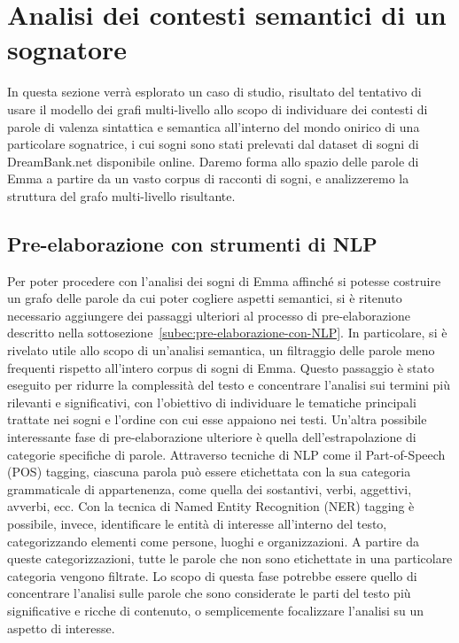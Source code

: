 \section{Analisi dei contesti semantici di un sognatore}\label{sec:analisi-dei-contesti-semantici-di-un-sognatore}

In questa sezione verrà esplorato un caso di studio, risultato del tentativo di usare il modello dei grafi multi-livello
allo scopo di individuare dei contesti di parole di valenza sintattica e semantica all'interno del mondo onirico
di una particolare sognatrice, i cui sogni sono stati prelevati dal dataset di sogni di DreamBank.net disponibile
online.
Daremo forma allo spazio delle parole di Emma a partire da un vasto corpus di racconti di sogni, e analizzeremo la
struttura del grafo multi-livello risultante.

\subsection{Pre-elaborazione con strumenti di NLP}

Per poter procedere con l'analisi dei sogni di Emma affinché si potesse costruire un grafo delle parole
da cui poter cogliere aspetti semantici, si è ritenuto necessario aggiungere dei passaggi ulteriori
al processo di pre-elaborazione descritto nella sottosezione~\ref{subec:pre-elaborazione-con-NLP}.
In particolare, si è rivelato utile allo scopo di un'analisi semantica,
un filtraggio delle parole meno frequenti rispetto all'intero corpus di sogni di Emma.
Questo passaggio è stato eseguito per ridurre la complessità del testo e concentrare l'analisi sui
termini più rilevanti e significativi, con l'obiettivo di individuare le tematiche principali trattate
nei sogni e l'ordine con cui esse appaiono nei testi.
Un'altra possibile interessante fase di pre-elaborazione ulteriore è quella dell'estrapolazione di categorie
specifiche di parole.
Attraverso tecniche di NLP come il Part-of-Speech (POS) tagging, ciascuna parola può essere etichettata con la sua
categoria grammaticale di appartenenza, come quella dei sostantivi, verbi, aggettivi, avverbi, ecc.
Con la tecnica di Named Entity Recognition (NER) tagging è possibile, invece, identificare le entità di interesse
all'interno del testo, categorizzando elementi come persone, luoghi e organizzazioni.
A partire da queste categorizzazioni, tutte le parole che non sono etichettate in una particolare
categoria vengono filtrate. Lo scopo di questa fase potrebbe essere quello di concentrare l'analisi sulle parole che
sono considerate le parti del testo più significative e ricche di contenuto, o semplicemente focalizzare l'analisi
su un aspetto di interesse.


